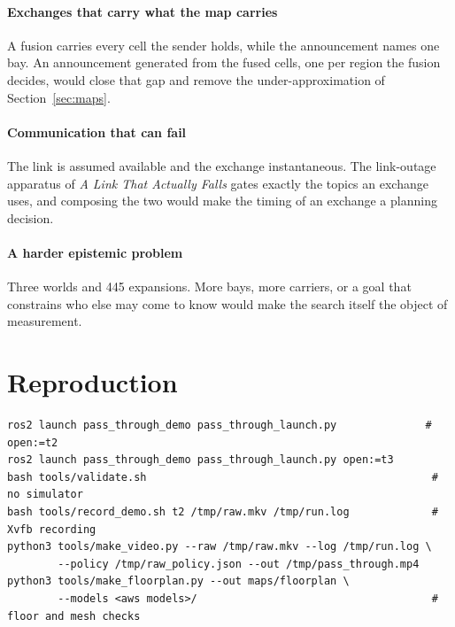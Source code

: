 \documentclass[11pt,a4paper]{article}
\theoremstyle{definition}
\begin{document}
\paragraph{Exchanges that carry what the map carries} A fusion carries every
cell the sender holds, while the announcement names one bay. An announcement
generated from the fused cells, one per region the fusion decides, would close
that gap and remove the under-approximation of Section~\ref{sec:maps}.

\paragraph{Communication that can fail} The link is assumed available and the
exchange instantaneous. The link-outage apparatus of \emph{A Link That
Actually Falls} gates exactly the topics an exchange uses, and composing the
two would make the timing of an exchange a planning decision.

\paragraph{A harder epistemic problem} Three worlds and 445 expansions.
More bays, more carriers, or a goal that constrains who else may come to know
would make the search itself the object of measurement.

\section*{Reproduction}

\begin{lstlisting}
ros2 launch pass_through_demo pass_through_launch.py              # open:=t2
ros2 launch pass_through_demo pass_through_launch.py open:=t3
bash tools/validate.sh                                             # no simulator
bash tools/record_demo.sh t2 /tmp/raw.mkv /tmp/run.log             # Xvfb recording
python3 tools/make_video.py --raw /tmp/raw.mkv --log /tmp/run.log \
        --policy /tmp/raw_policy.json --out /tmp/pass_through.mp4
python3 tools/make_floorplan.py --out maps/floorplan \
        --models <aws models>/                                     # floor and mesh checks
\end{lstlisting}
\end{document}
